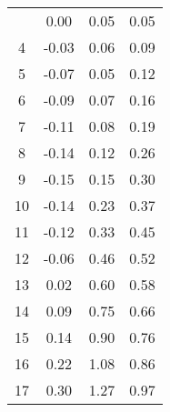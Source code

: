 \begin{longtable}[c]{cccc}
	\endlastfoot
	3                        & 0.00                                    & 0.05                                    & 0.05                       \\
	4                        & -0.03                                   & 0.06                                    & 0.09                       \\
	5                        & -0.07                                   & 0.05                                    & 0.12                       \\
	6                        & -0.09                                   & 0.07                                    & 0.16                       \\
	7                        & -0.11                                   & 0.08                                    & 0.19                       \\
	8                        & -0.14                                   & 0.12                                    & 0.26                       \\
	9                        & -0.15                                   & 0.15                                    & 0.30                       \\
	10                       & -0.14                                   & 0.23                                    & 0.37                       \\
	11                       & -0.12                                   & 0.33                                    & 0.45                       \\
	12                       & -0.06                                   & 0.46                                    & 0.52                       \\
	13                       & 0.02                                    & 0.60                                    & 0.58                       \\
	14                       & 0.09                                    & 0.75                                    & 0.66                       \\
	15                       & 0.14                                    & 0.90                                    & 0.76                       \\
	16                       & 0.22                                    & 1.08                                    & 0.86                       \\
	17                       & 0.30                                    & 1.27                                    & 0.97                       \\

\end{longtable}
